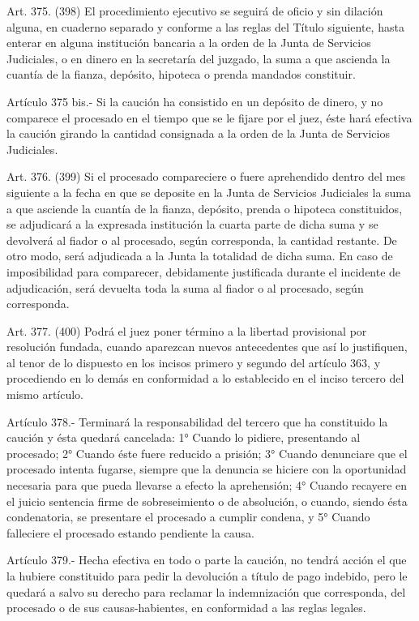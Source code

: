     Art. 375. (398) El procedimiento ejecutivo se seguirá de oficio y sin dilación alguna, en cuaderno separado y conforme a las reglas del Título siguiente, hasta enterar en alguna institución bancaria a la orden de la Junta de Servicios Judiciales, o en dinero en la secretaría del juzgado, la suma a que ascienda la cuantía de la fianza, depósito, hipoteca o prenda mandados constituir.

    Artículo 375 bis.- Si la caución ha consistido en un depósito de dinero, y no comparece el procesado en el tiempo que se le fijare por el juez, éste hará efectiva la caución girando la cantidad consignada a la orden de la Junta de Servicios Judiciales.

    Art. 376. (399) Si el procesado compareciere o fuere aprehendido dentro del mes siguiente a la fecha en que se deposite en la Junta de Servicios Judiciales la suma a que asciende la cuantía de la fianza, depósito, prenda o hipoteca constituidos, se adjudicará a la expresada institución la cuarta parte de dicha suma y se devolverá al fiador o al procesado, según corresponda, la cantidad restante.
    De otro modo, será adjudicada a la Junta la totalidad de dicha suma.
    En caso de imposibilidad para comparecer, debidamente justificada durante el incidente de adjudicación, será devuelta toda la suma al fiador o al procesado, según corresponda.



    Art. 377. (400) Podrá el juez poner término a la libertad provisional por resolución fundada, cuando aparezcan nuevos antecedentes que así lo justifiquen, al tenor de lo dispuesto en los incisos primero y segundo del artículo 363, y procediendo en lo demás en conformidad a lo establecido en el inciso tercero del mismo artículo.

    Artículo 378.-  Terminará la responsabilidad del tercero que ha constituido la caución y ésta quedará cancelada:
    1° Cuando lo pidiere, presentando al procesado;
    2° Cuando éste fuere reducido a prisión;
    3° Cuando denunciare que el procesado intenta fugarse, siempre que la denuncia se hiciere con la oportunidad necesaria para que pueda llevarse a efecto la aprehensión;
    4° Cuando recayere en el juicio sentencia firme de sobreseimiento o de absolución, o cuando, siendo ésta condenatoria, se presentare el procesado a cumplir condena, y
    5° Cuando falleciere el procesado estando pendiente la causa.



    Artículo 379.-  Hecha efectiva en todo o parte la caución, no tendrá acción el que la hubiere constituido para pedir la devolución a título de pago indebido, pero le quedará a salvo su derecho para reclamar la indemnización que corresponda, del procesado o de sus causas-habientes, en conformidad a las reglas legales.

